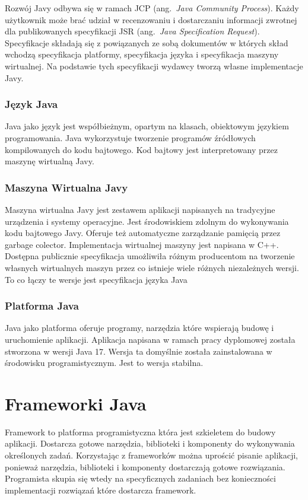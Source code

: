 Rozwój Javy odbywa się w ramach JCP (ang.~\emph{Java Community Process}). Każdy użytkownik może brać udział w recenzowaniu i dostarczaniu informacji zwrotnej dla publikowanych specyfikacji JSR (ang.~\emph{Java Specification Request}). Specyfikacje składają się z powiązanych ze sobą dokumentów w których skład wchodzą specyfikacja platformy, specyfikacja języka i specyfikacja maszyny wirtualnej. Na podstawie tych specyfikacji wydawcy tworzą własne implementacje Javy.

\subsubsection{Język Java}
Java jako język jest współbieżnym, opartym na klasach, obiektowym językiem programowania. Java wykorzystuje tworzenie programów źródłowych kompilowanych do kodu bajtowego. Kod bajtowy jest interpretowany przez maszynę wirtualną Javy.

\subsubsection{Maszyna Wirtualna Javy}
Maszyna wirtualna Javy jest zestawem aplikacji napisanych na tradycyjne urządzenia i systemy operacyjne. Jest środowiskiem  zdolnym do wykonywania kodu bajtowego Javy. Oferuje też automatyczne zarządzanie pamięcią przez garbage colector. Implementacja wirtualnej maszyny jest napisana w C++. Dostępna publicznie specyfikacja umożliwiła różnym producentom na tworzenie własnych wirtualnych maszyn przez co istnieje wiele różnych niezależnych wersji. To co łączy te wersje jest specyfikacja języka Java

\subsubsection{Platforma Java}
Java jako platforma oferuje programy, narzędzia które wspierają budowę i uruchomienie aplikacji. Aplikacja napisana w ramach pracy dyplomowej została stworzona w wersji Java 17. Wersja ta domyślnie została zainstalowana w środowisku programistycznym. Jest to wersja stabilna.

\section{Frameworki Java}
Framework to platforma programistyczna która jest szkieletem do budowy aplikacji. Dostarcza gotowe narzędzia, biblioteki i komponenty do wykonywania określonych zadań. Korzystając z frameworków można uprościć pisanie aplikacji, ponieważ narzędzia, biblioteki i komponenty dostarczają gotowe rozwiązania. Programista skupia się wtedy na specyficznych zadaniach bez konieczności implementacji rozwiązań które dostarcza framework. 

